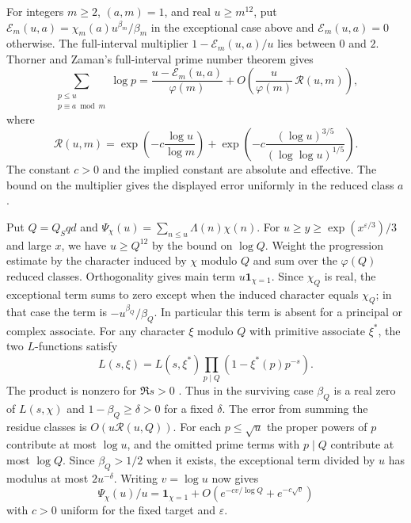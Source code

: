 %
For integers \(m\ge2\), \((a,m)=1\), and real \(u\ge m^{12}\), put
\(\mathcal E_m(u,a)=\chi_m(a)u^{\beta_m}/\beta_m\) in the exceptional
case above and \(\mathcal E_m(u,a)=0\) otherwise. The full-interval
multiplier \(1-\mathcal E_m(u,a)/u\) lies between \(0\) and \(2\).
Thorner and Zaman's full-interval prime number theorem gives
\[
 \sum_{\substack{p\le u\\p\equiv a\bmod m}}\log p
 = \frac{u-\mathcal E_m(u,a)}{\varphi(m)}
   +O\left(\frac{u}{\varphi(m)}\,\mathcal R(u,m)\right),
\]
where
\[
 \mathcal R(u,m)=\exp\left(-c\frac{\log u}{\log m}\right)
   +\exp\left(-c\frac{(\log u)^{3/5}}{(\log\log u)^{1/5}}\right).
\]
The constant \(c>0\) and the implied constant are absolute and
effective. The bound on the multiplier gives the displayed error
uniformly in the reduced class \(a\).
\cite[arXiv v2, Corollary~1.4, Remark~1.5 and (1.7)]{f1thorner-zaman}

Put \(Q=Q_Sqd\) and \(\Psi_\chi(u)=\sum_{n\le u}\Lambda(n)\chi(n)\).
For \(u\ge y\ge\exp(x^{\varepsilon/3})/3\) and large \(x\), we have
\(u\ge Q^{12}\) by the bound on \(\log Q\). Weight the progression
estimate by the character induced by \(\chi\) modulo \(Q\) and sum
over the \(\varphi(Q)\) reduced classes. Orthogonality gives main
term \(u\mathbf1_{\chi=1}\). Since \(\chi_Q\) is real, the exceptional
term sums to zero except when the induced character equals \(\chi_Q\);
in that case the term is \(-u^{\beta_Q}/\beta_Q\).
In particular this term is absent for a principal or complex
associate. For any character \(\xi\) modulo \(Q\)
with primitive associate \(\xi^*\), the two \(L\)-functions satisfy
\[
 L(s,\xi)=L(s,\xi^*)\prod_{p\mid Q}(1-\xi^*(p)p^{-s}).
\]
The product is nonzero for \(\Re s>0\) \cite[(25.15.4)]{dlmf}.
Thus in the surviving case \(\beta_Q\) is a real zero of \(L(s,\chi)\)
and \(1-\beta_Q\ge\delta>0\) for a fixed \(\delta\).
The error from summing the residue classes is
\(O(u\mathcal R(u,Q))\). For each \(p\le\sqrt{u}\) the proper powers
of \(p\) contribute at most \(\log u\), and the omitted prime terms
with \(p\mid Q\) contribute at most \(\log Q\). Since
\(\beta_Q>1/2\) when it exists, the exceptional term divided by \(u\)
has modulus at most \(2u^{-\delta}\). Writing \(v=\log u\) now gives
\[
 \Psi_\chi(u)/u=\mathbf1_{\chi=1}
    +O(e^{-cv/\log Q}+e^{-c\sqrt v})
\]
with \(c>0\) uniform for the fixed target and \(\varepsilon\).

